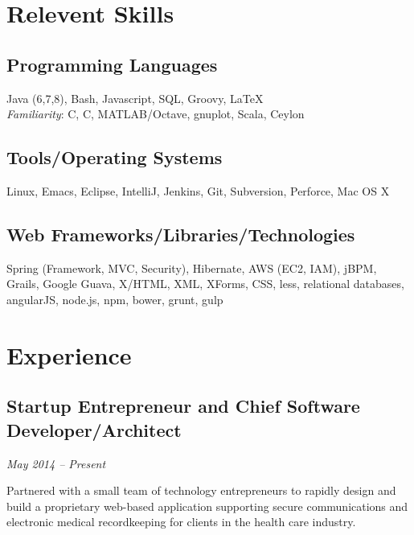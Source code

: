 \documentclass[a4paper,11pt]{article}
\newcommand{\CC}{C\nolinebreak\hspace{-.05em}\raisebox{.4ex}{\tiny\bf
    +}\nolinebreak\hspace{-.10em}\raisebox{.4ex}{\tiny\bf +}}
\def\CC{{C\nolinebreak[4]\hspace{-.05em}\raisebox{.4ex}{\tiny\bf ++}}}
\begin{document}

  \section*{Relevent Skills}

  \begin{multicols}{2}
    \raggedright

    \subsection*{Programming Languages}

    Java (6,7,8), Bash, Javascript, SQL, Groovy, \LaTeX \\
    \textsl{Familiarity}: C, \CC, MATLAB/Octave, gnuplot, Scala, Ceylon

    \subsection*{Tools/Operating Systems}

    Linux, Emacs, Eclipse, IntelliJ, Jenkins, Git, Subversion, Perforce, Mac OS
    X

    \subsection*{Web Frameworks/Libraries/Technologies}

    Spring (Framework, MVC, Security), Hibernate, AWS (EC2, IAM), jBPM, Grails, Google Guava,
    X/HTML, XML, XForms, CSS, less, relational databases, angularJS, node.js, npm, bower, grunt,
    gulp
    
    
  \end{multicols}
  

\section*{Experience}

\subsection*{Startup Entrepreneur and Chief Software Developer/Architect} 
\vskip -20pt
\hfill \textit{May 2014 -- Present}

Partnered with a small team of technology entrepreneurs to rapidly design and build a proprietary
web-based application supporting secure communications and electronic medical recordkeeping for
clients in the health care industry.
\end{document}
